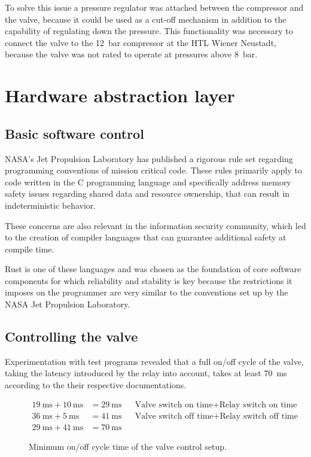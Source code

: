 To solve this issue a pressure regulator was attached between the compressor and the valve, because it could be used as a cut-off mechanism in addition to the capability of regulating down the pressure. This functionality was necessary to connect the valve to the \SI{12}{\bar} compressor at the HTL Wiener Neustadt, because the valve was not rated to operate at pressures above \SI{8}{\bar}.

\section{Hardware abstraction layer}
\author{Philip Trauner}

\subsection{Basic software control}
NASA's Jet Propulsion Laboratory \cite{jpl} has published a rigorous rule set \cite{jpl-rules} regarding programming conventions of mission critical code. These rules primarily apply to code written in the C programming language and specifically address memory safety issues regarding shared data and resource ownership, that can result in indeterministic behavior. 

These concerns are also relevant in the information security community, which led to the creation of compiler languages that can guarantee additional safety at compile time. 

Rust \cite{rust} is one of these languages and was chosen as the foundation of core software components for which reliability and stability is key because the restrictions it imposes on the programmer are very similar to the conventions set up by the NASA Jet Propulsion Laboratory. 

\subsection{Controlling the valve}
Experimentation with test programs revealed that a full on/off cycle of the valve, taking the latency introduced by the relay into account, takes at least \SI{70}{\milli\second} according to the their respective documentations. 
\begin{figure}[h]
\begin{align*}
    \SI{19}{\milli\second} + \SI{10}{\milli\second} &=\SI{29}{\milli\second} && \text{Valve switch on time} + \text{Relay switch on time} \\
    \SI{36}{\milli\second} + \SI{5}{\milli\second}  &=\SI{41}{\milli\second} && \text{Valve switch off time} + \text{Relay switch off time}\\
    \SI{29}{\milli\second} + \SI{41}{\milli\second} &=\SI{70}{\milli\second} 
\end{align*}
\caption{Minimum on/off cycle time of the valve control setup.}
\end{figure}

